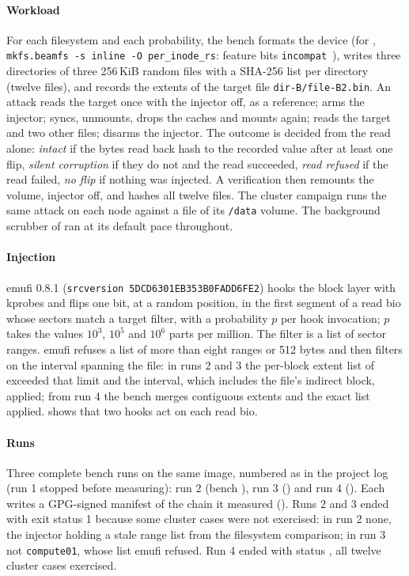 \paragraph*{Workload}
For each filesystem and each probability, the bench formats the device
(for \bfs, \texttt{mkfs.beamfs -s inline -O per\_inode\_rs}: feature
bits \texttt{incompat}~\featIncompat), writes three directories of three 256\,KiB random files with a SHA-256
list per directory (twelve files), and records the extents of the target
file \texttt{dir-B/file-B2.bin}. An attack reads the target once with the
injector off, as a reference; arms the injector; syncs, unmounts, drops
the caches and mounts again; reads the target and two other files;
disarms the injector. The outcome is decided from the read alone:
\emph{intact} if the bytes read back hash to the recorded value after at
least one flip, \emph{silent corruption} if they do not and the read
succeeded, \emph{read refused} if the read failed, \emph{no flip} if
nothing was injected. A verification then remounts the volume, injector
off, and hashes all twelve files. The cluster campaign runs the same
attack on each node against a file of its \texttt{/data} volume.
The background scrubber of \bfs ran at its default pace throughout.

\paragraph*{Injection}
emufi 0.8.1 (\texttt{srcversion 5DCD6301EB353B0FADD6FE2}) hooks the
block layer with kprobes and flips one bit, at a random position, in the
first segment of a read bio whose sectors match a target filter, with a
probability $p$ per hook invocation; $p$ takes the values $10^{3}$,
$10^{5}$ and $10^{6}$ parts per million. The filter is a list of sector
ranges. emufi refuses a list of more than eight ranges or 512 bytes and
then filters on the interval spanning the file: in runs 2 and 3 the
per-block extent list of \bfs exceeded that limit and the interval,
which includes the file's indirect block, applied; from run 4 the bench
merges contiguous extents and the exact list applied.
 shows that two hooks act on each \bfs read bio.

\paragraph*{Runs}
Three complete bench runs on the same image, numbered as in the project
log (run 1 stopped before measuring): run 2 (bench
\texttt{\commitBenchTwo}), run 3 (\texttt{\commitBenchThree}) and run 4
(\texttt{\commitBenchFour}). Each writes a GPG-signed manifest of the
chain it measured (\apprepro). Runs 2 and 3 ended with exit
status 1 because some cluster cases were not exercised: in run 2 none,
the injector holding a stale range list from the filesystem comparison;
in run 3 not \texttt{compute01}, whose list emufi refused. Run 4 ended
with status \rcRunFour{}, all twelve cluster cases exercised.

